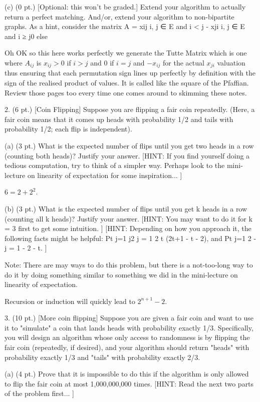 (c) (0 pt.) [Optional: this won't be graded.] Extend your algorithm to actually return a perfect matching. And/or, extend your algorithm to non-bipartite graphs. As a hint, consider the matrix A = xij {i, j} ∈ E and i < j - xji {i, j} ∈ E and i ≥ j0 else

Oh OK so this here works perfectly we generate the Tutte Matrix which is one where $A_{ij}$ is $x_{ij}>0$ if $i>j$ and $0$ if $i=j$ and $-x_{ij}$ for the actual $x_{ji}$ valuation thus ensuring that each permutation sign lines up perfectly by definition with the sign of the realised product of values. It is called like the square of the Pfaffian. Review those pages too every time one comes around to skimming these notes.

2. (6 pt.) [Coin Flipping] Suppose you are flipping a fair coin repeatedly. (Here, a fair coin means that it comes up heads with probability 1/2 and tails with probability 1/2; each flip is independent).

(a) (3 pt.) What is the expected number of flips until you get two heads in a row (counting both heads)? Justify your answer. [HINT: If you find yourself doing a tedious computation, try to think of a simpler way. Perhaps look to the mini-lecture on linearity of expectation for some inspiration... ]

$6=2+2^2$.

(b) (3 pt.) What is the expected number of flips until you get k heads in a row (counting all k heads)? Justify your answer. [HINT: You may want to do it for k = 3 first to get some intuition. ] [HINT: Depending on how you approach it, the following facts might be helpful: Pt j=1 j2 j = 1 2 t (2t+1 - t - 2), and Pt j=1 2 -j = 1 - 2 - t. ]

Note: There are may ways to do this problem, but there is a not-too-long way to do it by doing something similar to something we did in the mini-lecture on linearity of expectation.

Recursion or induction will quickly lead to $2^{n+1}-2$.

3. (10 pt.) [More coin flipping] Suppose you are given a fair coin and want to use it to "simulate" a coin that lands heads with probability exactly 1/3. Specifically, you will design an algorithm whose only access to randomness is by flipping the fair coin (repeatedly, if desired), and your algorithm should return "heads" with probability exactly 1/3 and "tails" with probability exactly 2/3.

(a) (4 pt.) Prove that it is impossible to do this if the algorithm is only allowed to flip the fair coin at most 1,000,000,000 times. [HINT: Read the next two parts of the problem first... ]

